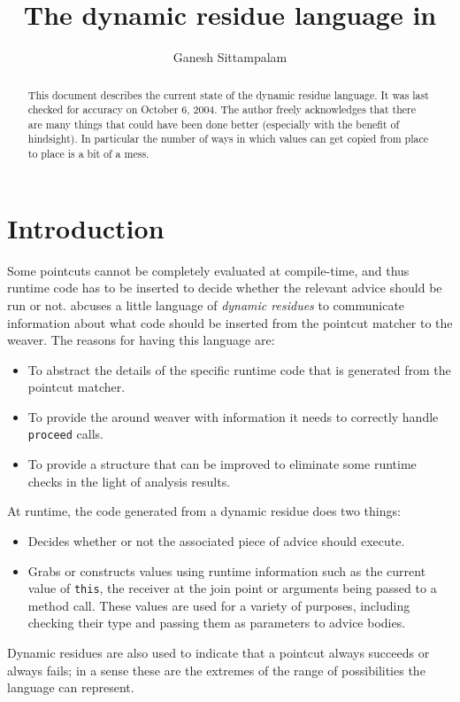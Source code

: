 \documentclass{article}
\title{The dynamic residue language in \abc}
\author{Ganesh Sittampalam}
\newcommand\abc{abc}
\begin{document}
\maketitle

\begin{abstract}
This document describes the current state of the dynamic residue language.
It was last checked for accuracy on October 6, 2004. The author freely
acknowledges that there are many things that could have been done better
(especially with the benefit of hindsight). In particular the number of ways
in which values can get copied from place to place is a bit of a mess.
\end{abstract}


\section{Introduction}
Some pointcuts cannot be completely evaluated at compile-time, and
thus runtime code has to be inserted to decide whether the relevant
advice should be run or not. \abc uses a little language of {\em dynamic
residues} to communicate information about what code should be inserted
from the pointcut matcher to the weaver. The reasons for having this
language are:
\begin{itemize}
\item
To abstract the details of the specific runtime code that is generated from
the pointcut matcher.
\item
To provide the around weaver with information it needs to correctly
handle \verb|proceed| calls.
\item
To provide a structure that can be improved to eliminate some runtime
checks in the light of analysis results.
\end{itemize}
At runtime, the code generated from a dynamic residue does two things:
\begin{itemize}
\item
Decides whether or not the associated piece of advice should execute.
\item
Grabs or constructs values using runtime information such as the current value
of \verb|this|, the receiver at the join point or arguments being passed to a
method call. These values are used for a variety of purposes, including
checking their type and passing them as parameters to advice bodies.
\end{itemize}

Dynamic residues are also used to indicate that a pointcut always succeeds
or always fails; in a sense these are the extremes of the range of 
possibilities the language can represent.
\end{document}
